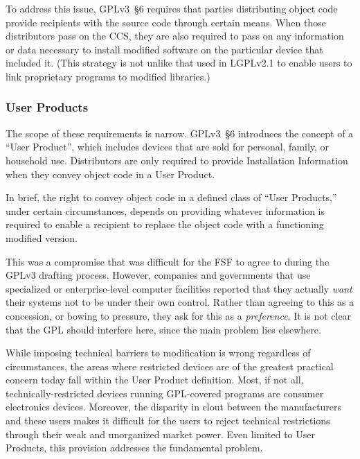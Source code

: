 To address this issue, GPLv3~\S6 requires that parties distributing object
code provide recipients with the source code through certain means.  When
those distributors pass on the CCS, they are also required to pass on any
information or data necessary to install modified software on the particular
device that included it.  (This strategy is not unlike that used in LGPLv2.1
to enable users to link proprietary programs to modified libraries.)


\subsubsection{User Products}

\label{user-product}

The scope of these requirements is narrow.  GPLv3~\S6 introduces the concept
of a ``User Product'', which includes devices that are sold for personal,
family, or household use.  Distributors are only required to provide
Installation Information when they convey object code in a User Product.

In brief, the right to convey object code in a defined class of ``User
Products,'' under certain circumstances, depends on providing whatever information
is required to enable a recipient to replace the object code with a functioning
modified version.

This was a compromise that was difficult for the FSF to agree to during the
GPLv3 drafting process.  However, companies and governments that use
specialized or enterprise-level computer facilities reported that they
actually \textit{want} their systems not to be under their own control.
Rather than agreeing to this as a concession, or bowing to pressure, they ask
for this as a \textit{preference}.  It is not clear that the GPL should interfere
here, since the main problem lies elsewhere.

While imposing technical barriers to modification is wrong regardless of
circumstances, the areas where restricted devices are of the greatest
practical concern today fall within the User Product definition.  Most, if
not all, technically-restricted devices running GPL-covered programs are
consumer electronics devices.  Moreover, the disparity in clout between the
manufacturers and these users makes it difficult for the users to reject
technical restrictions through their weak and unorganized market power.  Even
limited to User Products, this provision addresses the fundamental problem.

